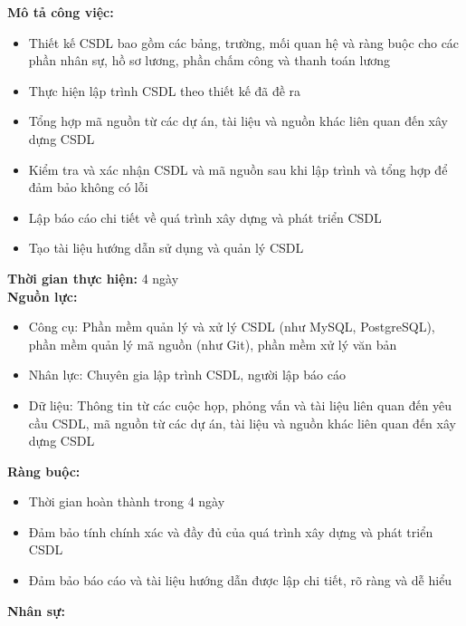 {\begin{minipage}{\textwidth}
\begin{itemize}
    \end{itemize}
    \vspace{0.5cm}
    \noindent \textbf{Mô tả công việc:}
    \begin{itemize}
        \item Thiết kế CSDL bao gồm các bảng, trường, mối quan hệ và ràng buộc cho các phần nhân sự, hồ sơ lương, phần chấm công và thanh toán lương
        \item Thực hiện lập trình CSDL theo thiết kế đã đề ra
        \item Tổng hợp mã nguồn từ các dự án, tài liệu và nguồn khác liên quan đến xây dựng CSDL
        \item Kiểm tra và xác nhận CSDL và mã nguồn sau khi lập trình và tổng hợp để đảm bảo không có lỗi
        \item Lập báo cáo chi tiết về quá trình xây dựng và phát triển CSDL
        \item Tạo tài liệu hướng dẫn sử dụng và quản lý CSDL
    \end{itemize}
    \vspace{0.5cm}
    \noindent \textbf{Thời gian thực hiện:} 4 ngày \\
    \noindent \textbf{Nguồn lực:}
    \begin{itemize}
        \item Công cụ: Phần mềm quản lý và xử lý CSDL (như MySQL, PostgreSQL), phần mềm quản lý mã nguồn (như Git), phần mềm xử lý văn bản
        \item Nhân lực: Chuyên gia lập trình CSDL, người lập báo cáo
        \item Dữ liệu: Thông tin từ các cuộc họp, phỏng vấn và tài liệu liên quan đến yêu cầu CSDL, mã nguồn từ các dự án, tài liệu và nguồn khác liên quan đến xây dựng CSDL
    \end{itemize}
    \vspace{0.5cm}
    \noindent \textbf{Ràng buộc:}
    \begin{itemize}
        \item Thời gian hoàn thành trong 4 ngày
        \item Đảm bảo tính chính xác và đầy đủ của quá trình xây dựng và phát triển CSDL
        \item Đảm bảo báo cáo và tài liệu hướng dẫn được lập chi tiết, rõ ràng và dễ hiểu
    \end{itemize}
    \vspace{0.5cm}
    \noindent \textbf{Nhân sự:}
    \begin{longtable}{|c|c|}
    \hline

\end{longtable}
\end{minipage}}
